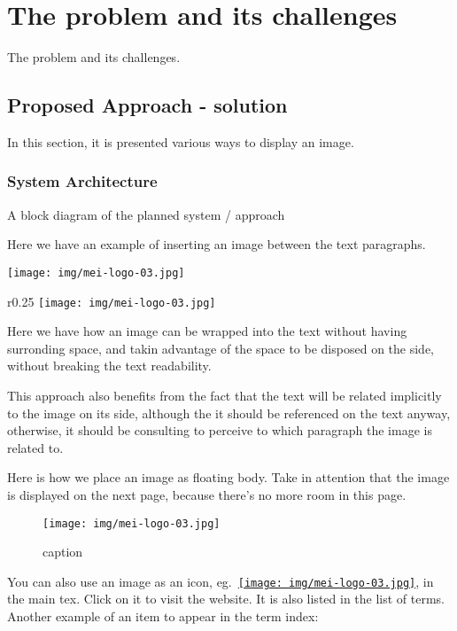 \chapter{The problem and its challenges}
         The problem and its challenges.

\section{Proposed Approach - solution}
In this section, it is presented various ways to display an image.
   \subsection{System Architecture}
   A block diagram of the planned system / approach

Here we have an example of inserting an image between the text paragraphs.
\begin{center}
  \texttt{[image: img/mei-logo-03.jpg]}
\end{center}

\begin{wrapfigure}{r}{0.25\textwidth}
  \texttt{[image: img/mei-logo-03.jpg]}
\end{wrapfigure}
Here we have how an image can be wrapped into the text without having surronding space, and takin advantage of the space to be disposed on the side, without breaking the text readability.

This approach also benefits from the fact that the text will be related implicitly to the image on its side, although the it should be referenced on the text anyway, otherwise, it should be consulting to perceive to which paragraph the image is related to.

Here is how we place an image as floating body.
Take in attention that the image is displayed on the next page, because there's no more room in this page.
\begin{figure}
\begin{center}
  \texttt{[image: img/mei-logo-03.jpg]}
\end{center}
\caption{caption}
\end{figure}



You can also use an image as an icon, eg.~\href{http://mei.di.uminho.pt}{\texttt{[image: img/mei-logo-03.jpg]}}, in the main tex.
Click on it to visit the website. It is also listed in the list of terms.
Another example of an item to appear in the term index: %
